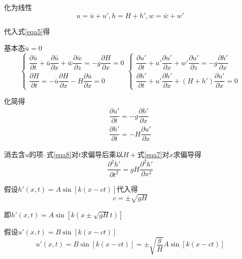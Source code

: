 \documentclass[a4paper,oneside]{ctexbook}
\begin{document}
化为线性
\begin{equation}
    u=\bar{u}+u',h=H+h',w=\bar{w}+w'
\end{equation}

代入式\ref{eqa5}得

基本态\(\bar{u}=0\)
\begin{equation}
    \left\{
        \begin{array}{l}
        \dfrac{\partial{\bar{u}}}{\partial{t}}+\bar{u}\dfrac{\partial{\bar{u}}}{\partial{x}}+\bar{w}\dfrac{\partial{\bar{w}}}{\partial{z}}=-g\dfrac{\partial{H}}{\partial{x}}=0\\
        \dfrac{\partial{H}}{\partial{t}}=-\bar{u}\dfrac{\partial{H}}{\partial{x}}-H\dfrac{\partial\bar{u}}{\partial{x}}=0
        \end{array}
    \right.
    \left\{
        \begin{array}{l}
        \dfrac{\partial{u}'}{\partial{t}}+u'\dfrac{\partial{u}'}{\partial{x}}+w'\dfrac{\partial{u}'}{\partial{z}}=-g\dfrac{\partial{h}'}{\partial{x}}\\
        \dfrac{\partial{h}'}{\partial{t}}+u'\dfrac{\partial{h}'}{\partial{x}}+(H+h')\dfrac{\partial{u}'}{\partial{x}}=0
        \end{array}
    \right.
    \label{eqa6}
\end{equation}

化简得
\begin{align}
    \dfrac{\partial{u}'}{\partial{t}}=-g\dfrac{\partial{h}'}{\partial{x}} \label{eqa7}\\
    \dfrac{\partial{h}'}{\partial{t}}=-H\dfrac{\partial{u}'}{\partial{x}} \label{eqa8}
\end{align}

消去含\(u\)的项--式\ref{eqa8}对\(t\)求偏导后乘以\(H+\)式\ref{eqa7}对\(x\)求偏导得 
\begin{equation}
    \dfrac{\partial^2h'}{\partial{t}^2}=gH\dfrac{\partial^2h'}{\partial{x}^2}
\end{equation}

假设\(h'(x,t)=A\sin{}[k(x-ct)]\)代入得
\begin{equation}
    c=\pm\sqrt{gH}
\end{equation}

即\(h'(x,t)=A\sin{}[k(x\pm\sqrt{gH}t)]\) 

假设\(u'(x,t)=B\sin{}[k(x-ct)]\)
\begin{equation}
    u'(x,t)=B\sin{}[k(x-ct)]=\pm\sqrt{\dfrac{g}{H}}A\sin{}[k(x-ct)]
\end{equation}
\end{document}
